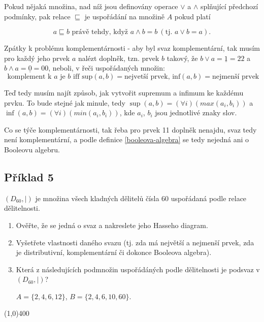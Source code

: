 \documentclass{article}
\begin{document}
\renewcommand{\labelenumi}{\alph{enumi})}

Pokud nějaká množina, nad níž jsou definovány operace $\vee$ a $\wedge$ splňující předchozí podmínky, pak relace $\sqsubseteq$ je uspořádání na množině $A$ pokud platí

\[ a \sqsubseteq b \text{ právě tehdy, když } a \wedge b = b \ (\text{tj. } a\vee b = a). \] 

Zpátky k problému komplementárnosti - aby byl svaz komplementární, tak musím pro každý jeho prvek $a$ nalézt doplněk, tzn. prvek $b$ takový, že $b \vee a = \underline{1} = 22$ a $b\wedge a = \underline{0} = 00$, neboli, v řeči uspořádaných množin:
\[ \text{ komplement k } a \mbox{ je } b \mbox{ iff sup}(a,b)=\mbox{nejvetší prvek, inf}(a,b)=\mbox{nejmenší prvek}  \]

Teď tedy musím najít způsob, jak vytvořit supremum a infimum ke každému prvku. To bude stejné jak minule, tedy $\sup(a,b) = (\forall i)(max(a_i,b_i))$ a $\inf(a,b) = (\forall i)(min(a_i,b_i))$, kde $a_i$, $b_i$ jsou jednotlivé znaky slov.
 
Co se týče komplementárnosti, tak řeba pro prvek 11 doplněk nenajdu, svaz tedy není komplementární, a podle definice \ref{booleova-algebra} se tedy nejedná ani o Booleovu algebru. 


\subsection{Příklad 5}
$(D_{60},|)$ je množina všech kladných dělitelů čísla 60 uspořádaná podle relace dělitelnosti. 

\begin{enumerate}
	\item Ověřte, že se jedná o svaz a nakreslete jeho Hasseho diagram.
	\item Vyšetřete vlastnosti daného svazu (tj. zda má největší a nejmenší prvek, zda je distributivní, komplementární či dokonce Booleova algebra).  
	\item Která z následujících podmnožin uspořádáných podle dělitelnosti je podsvaz v $(D_{60},|)$?
	
	$A = \{2,4,6,12\}$, $B = \{2,4,6,10,60\}$.
\end{enumerate}

\line(1,0){400}
\end{document}
